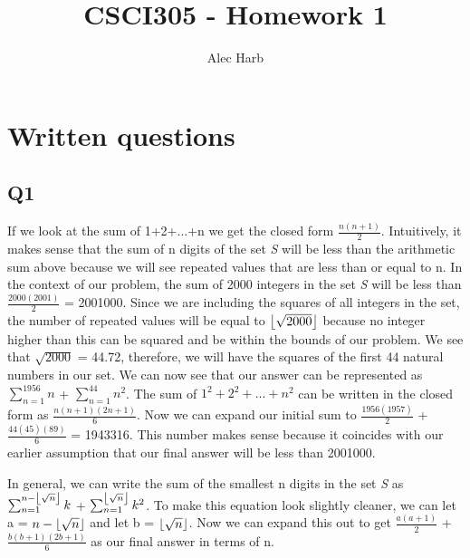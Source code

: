 \documentclass{article}
\newcommand{\forceindent}{\leavevmode{\parindent=2em\indent}}
\DeclarePairedDelimiter\floor{\lfloor}{\rfloor}
\begin{document}
\title{CSCI305 - Homework 1}
\date{Alec Harb}
\maketitle

\section{Written questions}

\subsection{Q1}

\forceindent If we look at the sum of 1+2+...+n we get the closed form $\frac{n(n+1)}{2}$. Intuitively, it makes sense that the sum of n digits of the set {\textit{S}} will be less than the arithmetic sum above because we will see repeated values that are less than or equal to n. In the context of our problem, the sum of 2000 integers in the set  {\textit{S}} will be less than $ \frac{2000(2001)}{2}$ = 2001000.  Since we are including the squares of all integers in the set, the number of repeated values will be equal to $\floor * {\sqrt{2000}}$ because no integer higher than this can be squared and be within the bounds of our problem. We see that $\sqrt{2000}$ = 44.72, therefore, we will have the squares of the first 44 natural numbers in our set. We can now see that our answer can be represented as $\sum_{n=1}^{1956} n$ + $\sum_{n=1}^{44} {n}^2$. The sum of ${1}^2+{2}^2+...+{n}^2$ can be written in the closed form as $\frac{n(n+1)(2n+1)}{6}$. Now we can expand our initial sum to $ \frac{1956(1957)}{2}$ + $\frac{44(45)(89)}{6}$ = 1943316. This number makes sense because it coincides with our earlier assumption that our final answer will be less than 2001000.
	
\par

\forceindent In general, we can write the sum of the smallest n digits in the set {\textit{S}} as $\sum_{n=1}^{n - \floor * {\sqrt{n}}} k$ + $\sum_{n=1}^{\floor * {\sqrt{n}}} {k}^2$. To make this equation look slightly cleaner, we can let a = ${n - \floor * {\sqrt{n}}}$ and let b = $\floor * {\sqrt{n}}$. Now we can expand this out to get $ \frac{a(a+1)}{2}$ + $\frac{b(b+1)(2b+1)}{6}$ as our final answer in terms of n.
	
\end{document}
